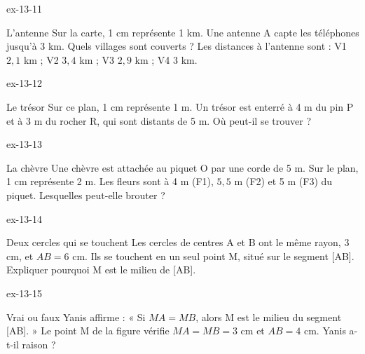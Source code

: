 \begin{blocLivre}{ex-13-11}\begin{exercice}[3]{L’antenne}
Sur la carte, 1 cm représente 1 km. Une antenne A capte les téléphones jusqu’à 3 km. Quels villages sont couverts ? Les distances à l’antenne sont : V1 $2{,}1$ km ; V2 $3{,}4$ km ; V3 $2{,}9$ km ; V4 3 km.
\label{fig-ex-13-11}
\end{exercice}\end{blocLivre}
\begin{blocLivre}{ex-13-12}\begin{exercice}[3]{Le trésor}
Sur ce plan, 1 cm représente 1 m. Un trésor est enterré à 4 m du pin P et à 3 m du rocher R, qui sont distants de 5 m. Où peut-il se trouver ?
\label{fig-ex-13-12}
\end{exercice}\end{blocLivre}
\begin{blocLivre}{ex-13-13}\begin{exercice}[3]{La chèvre}
Une chèvre est attachée au piquet O par une corde de 5 m. Sur le plan, 1 cm représente 2 m. Les fleurs sont à 4 m (F1), $5{,}5$ m (F2) et 5 m (F3) du piquet. Lesquelles peut-elle brouter ?
\label{fig-ex-13-13}
\end{exercice}\end{blocLivre}
\begin{blocLivre}{ex-13-14}\begin{exercice}[3]{Deux cercles qui se touchent}
Les cercles de centres A et B ont le même rayon, 3 cm, et $AB=6$ cm. Ils se touchent en un seul point M, situé sur le segment [AB]. Expliquer pourquoi M est le milieu de [AB].
\label{fig-ex-13-14}
\end{exercice}\end{blocLivre}
\begin{blocLivre}{ex-13-15}\begin{exercice}[3]{Vrai ou faux}
Yanis affirme : « Si $MA=MB$, alors M est le milieu du segment [AB]. » Le point M de la figure vérifie $MA=MB=3$ cm et $AB=4$ cm. Yanis a-t-il raison ?
\label{fig-ex-13-15}
\end{exercice}\end{blocLivre}

\clearpage
